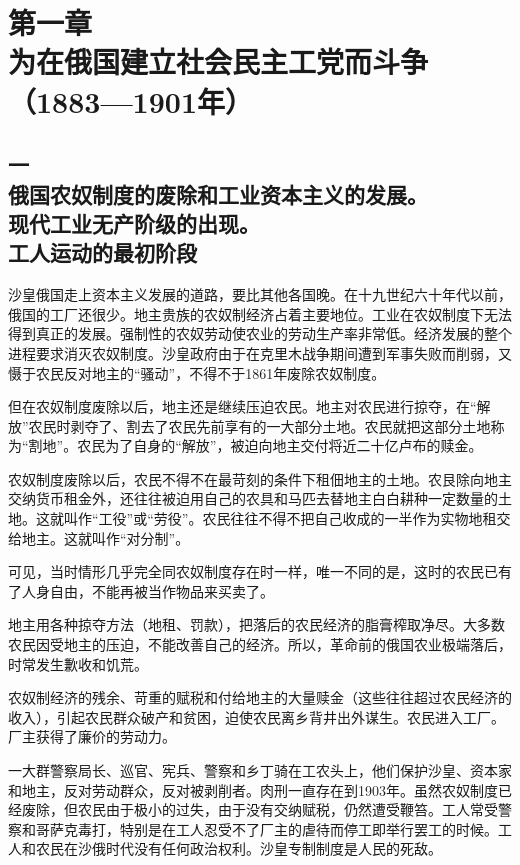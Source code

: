 \section[第一章\q 为在俄国建立社会民主工党而斗争（1883—1901年）]{第一章\\ 为在俄国建立社会民主工党而斗争\\ {（1883—1901年）}}

\subsection[一\q 俄国农奴制度的废除和工业资本主义的发展。现代工业无产阶级的出现。工人运动的最初阶段]{一\\ 俄国农奴制度的废除和工业资本主义的发展。\\ 现代工业无产阶级的出现。\\ 工人运动的最初阶段}

沙皇俄国走上资本主义发展的道路，要比其他各国晚。在十九世纪六十年代以前，俄国的工厂还很少。地主贵族的农奴制经济占着主要地位。工业在农奴制度下无法得到真正的发展。强制性的农奴劳动使农业的劳动生产率非常低。经济发展的整个进程要求消灭农奴制度。沙皇政府由于在克里木战争期间遭到军事失败而削弱，又慑于农民反对地主的“骚动”，不得不于1861年废除农奴制度。

但在农奴制度废除以后，地主还是继续压迫农民。地主对农民进行掠夺，在“解放”农民时剥夺了、割去了农民先前享有的一大部分土地。农民就把这部分土地称为“割地”。农民为了自身的“解放”，被迫向地主交付将近二十亿卢布的赎金。

农奴制度废除以后，农民不得不在最苛刻的条件下租佃地主的土地。农艮除向地主交纳货币租金外，还往往被迫用自己的农具和马匹去替地主白白耕种一定数量的土地。这就叫作“工役”或“劳役”。农民往往不得不把自己收成的一半作为实物地租交给地主。这就叫作“对分制”。

可见，当时情形几乎完全同农奴制度存在时一样，唯一不同的是，这时的农民已有了人身自由，不能再被当作物品来买卖了。

地主用各种掠夺方法（地租、罚款），把落后的农民经济的脂膏榨取净尽。大多数农民因受地主的压迫，不能改善自己的经济。所以，革命前的俄国农业极端落后，时常发生歉收和饥荒。

农奴制经济的残余、苛重的赋税和付给地主的大量赎金（这些往往超过农民经济的收入），引起农民群众破产和贫困，迫使农民离乡背井出外谋生。农民进入工厂。厂主获得了廉价的劳动力。

一大群警察局长、巡官、宪兵、警察和乡丁骑在工农头上，他们保护沙皇、资本家和地主，反对劳动群众，反对被剥削者。肉刑一直存在到1903年。虽然农奴制度已经废除，但农民由于极小的过失，由于没有交纳赋税，仍然遭受鞭笞。工人常受警察和哥萨克毒打，特别是在工人忍受不了厂主的虐待而停工即举行罢工的时候。工人和农民在沙俄时代没有任何政治权利。沙皇专制制度是人民的死敌。

